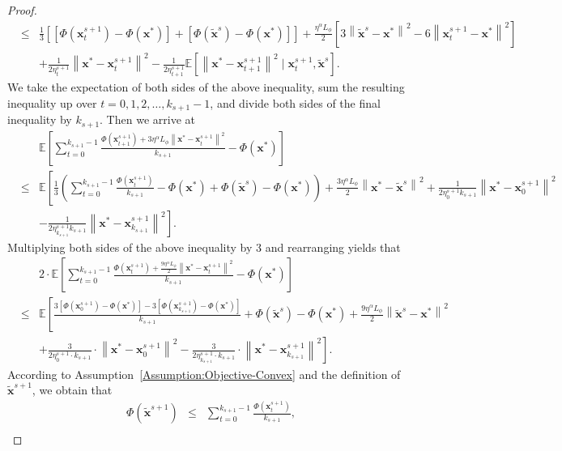 \documentclass[11pt]{article}
\newcommand{\BE}{\mathbb{E}}
\newcommand{\x}{\mathbf x}
\begin{document}
\begin{proof}
\begin{eqnarray*}
& \leq & \frac{1}{3} \left[ \left[\Phi(\x_t^{s+1}) - \Phi(\x^*) \right] + \left[ \Phi(\tilde{\x}^s) - \Phi(\x^*) \right] \right] + \frac{\eta^{\alpha} L_\phi}{2} \left[3\left\|\tilde{\x}^s - \x^*\right\|^2 - 6\left\| \x_t^{s+1} - \x^*\right\|^2\right]  \\
& & + \frac{1}{2\eta_t^{s+1}} \left\| \x^* - \x_t^{s+1} \right\|^2 - \frac{1}{2\eta_{t+1}^{s+1}} \BE\left[\left\| \x^* - \x_{t+1}^{s+1} \right\|^2 \mid \x_t^{s+1}, \tilde{\x}^s \right]. 
\end{eqnarray*}
We take the expectation of both sides of the above inequality, sum the resulting inequality up over $t=0,1,2,\ldots,k_{s+1}-1$, and divide both sides of the final inequality by $k_{s+1}$. Then we arrive at
\begin{eqnarray*}
& & \BE\left[\sum_{t=0}^{k_{s+1}-1} \frac{\Phi(\x_{t+1}^{s+1}) + 3\eta^{\alpha} L_\phi \left\| \x^* - \x_t^{s+1} \right\|^2}{k_{s+1}} - \Phi(\x^*)\right] \\ 
& \leq & \BE\left[ \frac{1}{3}\left(\sum_{t=0}^{k_{s+1}-1} \frac{\Phi(\x_t^{s+1})}{k_{s+1}} - \Phi(\x^*) + \Phi(\tilde{\x}^s) - \Phi(\x^*) \right) + \frac{3 \eta^{\alpha} L_\phi}{2} \left\|\x^* - \tilde{\x}^s\right\|^2 + \frac{1}{2\eta_0^{s+1} k_{s+1}}\left\| \x^* - \x_0^{s+1} \right\|^2 \right. \\
& & \left. - \frac{1}{2\eta_{k_{s+1}}^{s+1} k_{s+1}} \left\| \x^* - \x_{k_{s+1}}^{s+1} \right\|^2 \right]. 
\end{eqnarray*}
Multiplying both sides of the above inequality by 3 and rearranging yields that
\begin{eqnarray*}
& & 2 \cdot \BE\left[\sum_{t=0}^{k_{s+1}-1} \frac{\Phi(\x_t^{s+1}) + \frac{9\eta^{\alpha} L_\phi}{2}\left\| \x^* - \x_t^{s+1}\right\|^2}{k_{s+1}} - \Phi(\x^*)\right] \\
& \leq & \BE\left[\frac{3\left[\Phi(\x_0^{s+1})-\Phi(\x^*)\right] - 3\left[ \Phi(\x_{k_{s+1}}^{s+1})-\Phi(\x^*)\right]}{k_{s+1}} + \Phi(\tilde{\x}^s) - \Phi(\x^*) + \frac{9\eta^{\alpha} L_\phi}{2}\left\|\tilde{\x}^s - \x^*\right\|^2 \right. \\
& & \left. + \frac{3}{2\eta_0^{s+1} \cdot k_{s+1}}\cdot\left\| \x^* - \x_0^{s+1} \right\|^2 - \frac{3}{2\eta_{k_{s+1}}^{s+1} \cdot k_{s+1}}\cdot\left\| \x^* - \x_{k_{s+1}}^{s+1} \right\|^2 \right]. 
\end{eqnarray*}
According to Assumption~\ref{Assumption:Objective-Convex} and the definition of $\tilde{\x}^{s+1}$, we obtain that
\begin{eqnarray*}
\Phi(\tilde{\x}^{s+1}) & \leq & \sum_{t=0}^{k_{s+1}-1} \frac{\Phi(\x_t^{s+1})}{k_{s+1}}, \\

\end{eqnarray*}
\end{proof}
\end{document}
